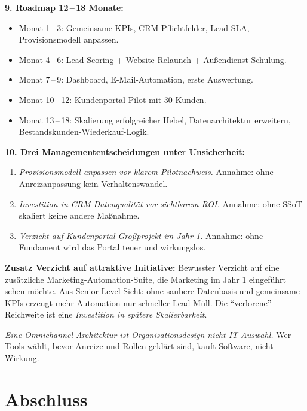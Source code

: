 \documentclass[11pt,a4paper,oneside]{article}
\begin{document}
\begin{loesungbox}
\textbf{9. Roadmap 12\,--\,18 Monate:}
\begin{itemize}
  \item Monat 1\,--\,3: Gemeinsame KPIs, CRM-Pflichtfelder, Lead-SLA, Provisionsmodell anpassen.
  \item Monat 4\,--\,6: Lead Scoring + Website-Relaunch + Außendienst-Schulung.
  \item Monat 7\,--\,9: Dashboard, E-Mail-Automation, erste Auswertung.
  \item Monat 10\,--\,12: Kundenportal-Pilot mit 30 Kunden.
  \item Monat 13\,--\,18: Skalierung erfolgreicher Hebel, Datenarchitektur erweitern, Bestandskunden-Wiederkauf-Logik.
\end{itemize}

\textbf{10. Drei Managemententscheidungen unter Unsicherheit:}
\begin{enumerate}
  \item \emph{Provisionsmodell anpassen vor klarem Pilotnachweis.} Annahme: ohne Anreizanpassung kein Verhaltenswandel.
  \item \emph{Investition in CRM-Datenqualität vor sichtbarem ROI.} Annahme: ohne SSoT skaliert keine andere Maßnahme.
  \item \emph{Verzicht auf Kundenportal-Großprojekt im Jahr 1.} Annahme: ohne Fundament wird das Portal teuer und wirkungslos.
\end{enumerate}

\textbf{Zusatz \textendash{} Verzicht auf attraktive Initiative:}
Bewusster Verzicht auf eine zusätzliche Marketing-Automation-Suite, die Marketing im Jahr 1 eingeführt sehen möchte. Aus Senior-Level-Sicht: ohne saubere Datenbasis und gemeinsame KPIs erzeugt mehr Automation nur schneller Lead-Müll. Die ``verlorene'' Reichweite ist eine \emph{Investition in spätere Skalierbarkeit}.

\begin{merkbox}
\emph{Eine Omnichannel-Architektur ist Organisationsdesign \textendash{} nicht IT-Auswahl.} Wer Tools wählt, bevor Anreize und Rollen geklärt sind, kauft Software, nicht Wirkung.
\end{merkbox}
\end{loesungbox}

\clearpage

\section*{Abschluss}
\thispagestyle{plain}
\end{document}

